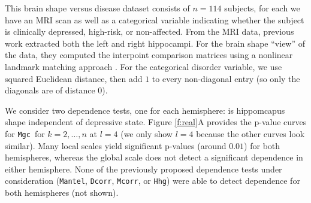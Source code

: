 \documentclass[11pt]{article}
\newcommand{\note}[2][]{\added[#1,remark={#2}]{}}
\providecommand{\sct}[1]{{\sc \texttt{#1}}}
\newcommand{\Mgc}{\sct{Mgc}}
\newcommand{\Hhg}{\sct{Hhg}}
\newcommand{\Dcorr}{\sct{Dcorr}}
\newcommand{\Mcorr}{\sct{Mcorr}}
\newcommand{\Mantel}{\sct{Mantel}}
\newcommand{\cs}[1]{{\note{cs: #1}}}
\begin{document}

This brain shape versus disease dataset consists of $n=114$ subjects, for each we have an MRI scan as well as a categorical variable indicating whether the subject is clinically depressed, high-risk, or non-affected.  From the MRI data, previous work  extracted both the left and right hippocampi.   For the brain shape ``view'' of the data, they computed the interpoint comparison matrices using a nonlinear landmark matching approach \cite{ParkEtAl2008,BegEtAl2005}.
For the categorical disorder variable,
we use squared Euclidean distance, then add $1$ to every non-diagonal entry (so only the diagonals are of distance $0$). \cs{make sure the above is correct.}

We consider two dependence tests, one for each hemisphere: is hippomcapus shape independent of depressive state.
Figure \ref{f:real}A provides the p-value curves for \Mgc~for $k=2,\ldots,n$ at $l=4$  (we only show $l=4$ because the other curves look similar). Many local scales yield significant p-values (around $0.01$) for both hemispheres, whereas the global scale does not detect a significant dependence in either hemisphere. None of the previously proposed dependence tests under consideration (\Mantel, \Dcorr, \Mcorr, or \Hhg) were able to detect dependence for both hemispheres (not shown).
\end{document}
